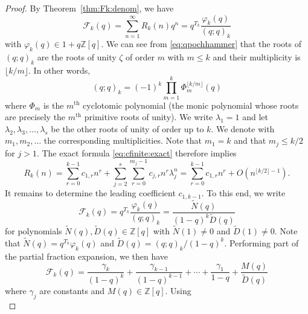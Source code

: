 \documentclass[10pt,a4paper]{amsart}
\begin{document}
\begin{proof}
  By Theorem~\ref{thm:Fk:denom}, we have
  \begin{equation*}
    \mathcal{F}_k (q) = \sum_{n = 1}^{\infty} R_k (n) q^n = q^{T_k} 
     \frac{\varphi_k (q)}{(q ; q)_k}
  \end{equation*}
  with $\varphi_k (q) \in 1 + q\mathbb{Z} [q]$. We can see from
  \eqref{eq:qpochhammer} that the roots of $(q ; q)_k$ are the roots of unity
  $\zeta$ of order $m$ with $m \leq k$ and their multiplicity is $\lfloor
  k / m \rfloor$. In other words,
  \begin{equation*}
    (q ; q)_k = (- 1)^k \prod_{m = 1}^k \Phi_m^{\lfloor k / m \rfloor} (q)
  \end{equation*}
  where $\Phi_m$ is the $m^{\text{th}}$ cyclotomic polynomial (the monic
  polynomial whose roots are precisely the $m^{\text{th}}$ primitive roots of
  unity). We write $\lambda_1 = 1$ and let $\lambda_2, \lambda_3, \ldots,
  \lambda_s$ be the other roots of unity of order up to $k$. We denote with
  $m_1, m_2, \ldots$ the corresponding multiplicities. Note that $m_1 = k$ and
  that $m_j \leq k / 2$ for $j > 1$. The exact formula
  \eqref{eq:cfinite:exact} therefore implies
  \begin{equation}
    R_k (n) = \sum_{r = 0}^{k - 1} c_{1, r} n^r + \sum_{j = 2}^s \sum_{r =
    0}^{m_j - 1} c_{j, r} n^r \lambda_j^n = \sum_{r = 0}^{k - 1} c_{1, r} n^r
    + O (n^{\lfloor k / 2 \rfloor - 1}) . \label{eq:Rk:asy:1}
  \end{equation}
  It remains to determine the leading coefficient $c_{1, k - 1}$. To this end,
  we write
  \begin{equation*}
    \mathcal{F}_k (q) = q^{T_k}  \frac{\varphi_k (q)}{(q ; q)_k} =
     \frac{\tilde{N} (q)}{(1 - q)^k \tilde{D} (q)}
  \end{equation*}
  for polynomials $\tilde{N} (q), \tilde{D} (q) \in \mathbb{Z} [q]$ with
  $\tilde{N} (1) \neq 0$ and $\tilde{D} (1) \neq 0$. Note that $\tilde{N} (q)
  = q^{T_k} \varphi_k (q)$ and $\tilde{D} (q) = (q ; q)_k / (1 - q)^k$.
  Performing part of the partial fraction expansion, we then have
  \begin{equation*}
    \mathcal{F}_k (q) = \frac{\gamma_k}{(1 - q)^k} + \frac{\gamma_{k - 1}}{(1
     - q)^{k - 1}} + \cdots + \frac{\gamma_1}{1 - q} + \frac{M (q)}{\tilde{D}
     (q)}
  \end{equation*}
  where $\gamma_j$ are constants and $M (q) \in \mathbb{Z} [q]$. Using
  \begin{equation*}

\end{equation*}
\end{proof}
\end{document}
